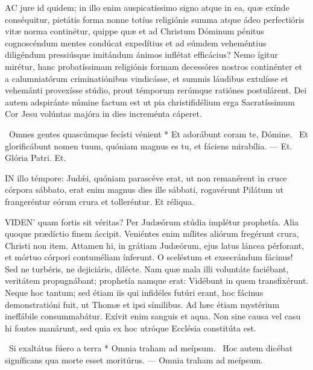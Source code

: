 
\lettrine[lines=2]{A}{C} jure id quidem; in illo enim auspicatíssimo signo atque in ea, quæ exínde conséquitur, pietátis forma nonne totíus religiónis summa atque ádeo perfectióris vitæ norma continétur, quippe quæ et ad Christum Dóminum pénitus cognoscéndum mentes condúcat expedítius et ad eúmdem veheméntius diligéndum pressiúsque imitándum ánimos inflétat efficácius? Nemo ígitur mirétur, hanc probatíssimam religiónis formam decessóres nostros continénter et a calumniatórum criminatiónibus vindicásse, et summis láudibus extulísse et vehemánti provexísse stúdio, prout témporum rerúmque ratiónes postulárent. Dei autem adspiránte númine factum est ut pia christifidélium erga Sacratíssimum Cor Jesu volúntas majóra in dies increménta cáperet.

\R\ Omnes gentes quascúmque fecísti vénient * Et adorábunt coram te, Dómine. \V\ Et glorificábunt nomen tuum, quóniam magnus es tu, et fáciens mirabília. --- Et. Glória Patri. Et.




\lettrine[lines=2]{I}{N} illo témpore: Judǽi, quóniam parascéve erat, ut non remanérent in cruce córpora sábbato, erat enim magnus dies ille sábbati, rogavérunt Pilátum ut frangeréntur eórum crura et tolleréntur. Et réliqua.



\lettrine[lines=2]{V}{IDEN}' quam fortis sit véritas? Per Judæórum stúdia implétur prophetía. Alia quoque prædíctio finem áccipit. Veniéntes enim mílites aliórum fregérunt crura, Christi non item. Attamen hi, in grátiam Judæórum, ejus latus láncea pérforant, et mórtuo córpori contuméliam ínferunt. O sceléstum et exsecrándum fácinus! Sed ne turbéris, ne dejiciáris, dilécte. Nam quæ mala illi voluntáte faciébant, veritátem propugnábant; prophetía namque erat: Vidébunt in quem transfixérunt. Neque hoc tantum; sed étiam iis qui infidéles futúri erant, hoc fácinus demonstratióni fuit, ut Thomæ et ipsi símilibus. Ad hæc étiam mystérium ineffábile consummabátur. Exívit enim sanguis et aqua. Non sine causa vel casu hi fontes manárunt, sed quia ex hoc utróque Ecclésia constitúta est.

\R\ Si exaltátus fúero a terra * Omnia traham ad meípsum. \V\ Hoc autem dicébat signíficans qua morte esset moritúrus. --- Omnia traham ad meípsum.

